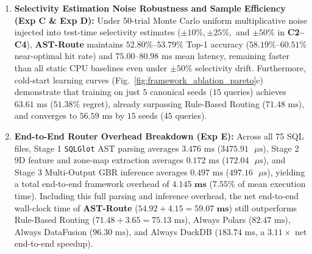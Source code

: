 \documentclass[10pt,a4paper]{article}
\begin{document}
\begin{enumerate}[leftmargin=1.5em,itemsep=2pt]
    \item \textbf{Selectivity Estimation Noise Robustness and Sample Efficiency (Exp C \& Exp D):} Under 50-trial Monte Carlo uniform multiplicative noise injected into test-time selectivity estimates ($\pm 10\%, \pm 25\%,$ and $\pm 50\%$ in \textbf{C2--C4}), \textbf{AST-Route} maintains $52.80\%\text{--}53.79\%$ Top-1 accuracy ($58.19\%\text{--}60.51\%$ near-optimal hit rate) and $75.00\text{--}80.98\text{ ms}$ mean latency, remaining faster than all static CPU baselines even under $\pm 50\%$ selectivity drift. Furthermore, cold-start learning curves (Fig.~\ref{fig:framework_ablation_pareto}c) demonstrate that training on just $5$ canonical seeds ($15$ queries) achieves $63.61\text{ ms}$ ($51.38\%$ regret), already surpassing Rule-Based Routing ($71.48\text{ ms}$), and converges to $56.59\text{ ms}$ by $15$ seeds ($45$ queries).
    \item \textbf{End-to-End Router Overhead Breakdown (Exp E):} Across all 75 SQL files, Stage 1 \texttt{SQLGlot} AST parsing averages $3.476\text{ ms}$ ($3475.91\text{ }\mu\text{s}$), Stage 2 9D feature and zone-map extraction averages $0.172\text{ ms}$ ($172.04\text{ }\mu\text{s}$), and Stage 3 Multi-Output GBR inference averages $0.497\text{ ms}$ ($497.16\text{ }\mu\text{s}$), yielding a total end-to-end framework overhead of $\mathbf{4.145\text{ ms}}$ ($7.55\%$ of mean execution time). Including this full parsing and inference overhead, the net end-to-end wall-clock time of \textbf{AST-Route} ($54.92 + 4.15 = \mathbf{59.07\text{ ms}}$) still outperforms Rule-Based Routing ($71.48 + 3.65 = 75.13\text{ ms}$), Always Polars ($82.47\text{ ms}$), Always DataFusion ($96.30\text{ ms}$), and Always DuckDB ($183.74\text{ ms}$, a $\mathbf{3.11\times}$ net end-to-end speedup).
\end{enumerate}
\end{document}
